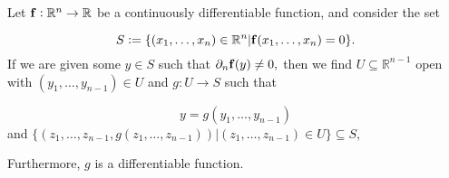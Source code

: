 \begin{thm}
Let \(\mathbf{ f}: \mathbb R^n \to \mathbb R\) be a continuously differentiable
function, and consider the set

\[S := \{(x_1, \ldots, x_n) \in \mathbb R^n | \mathbf{ f}(x_1, \ldots, x_n) = 0\}.\]
If we are given some \(y \in S\) such that \(\partial_n \mathbf{ f}(y) \neq 0,\)
then we find \(U \subseteq \mathbb R^{n-1}\) open with
\((y_1, \ldots, y_{n-1}) \in U\) and \(g: U \to S\) such that

\[y = g(y_1, \ldots, y_{n-1})\] and
\(\{(z_1, \ldots, z_{n-1}, g(z_1, \ldots, z_{n-1})) | (z_1, \ldots, z_{n-1}) \in U\} \subseteq S,\)


Furthermore, \(g\) is a differentiable function.
\end{thm}


